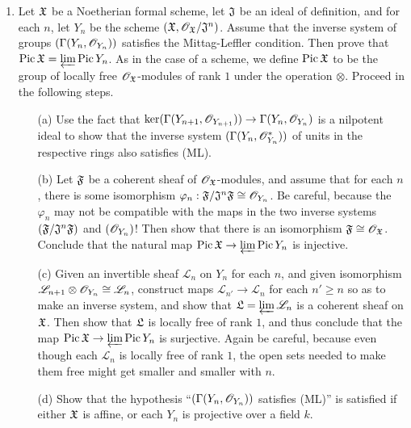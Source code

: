 \documentclass{article}
\begin{document}
\begin{enumerate} [label=\textbf{\arabic*.}, leftmargin=0em]
\item Let $\mathfrak{X}$ be a Noetherian formal scheme, let $\mathfrak{J}$ be an ideal of definition, and for each $n$, let $Y_n$ be the scheme $(\mathfrak{X}, \mathscr{O}_{\mathfrak{X}} / \mathfrak{J}^n)$. Assume that the inverse system of groups $(\Gamma(Y_n, \mathscr{O}_{Y_n}))$ satisfies the Mittag-Leffler condition. Then prove that $\operatorname{Pic}{\mathfrak{X}} = \varprojlim \operatorname{Pic}{Y_n}$. As in the case of a scheme, we define $\operatorname{Pic}{\mathfrak{X}}$ to be the group of locally free $\mathscr{O}_{\mathfrak{X}}$-modules of rank $1$ under the operation $\otimes$. Proceed in the following steps.
\begin{itemize}
    \item[(a)] Use the fact that $\text{ker}(\Gamma(Y_{n + 1}, \mathscr{O}_{Y_{n + 1}})) \to \Gamma(Y_n, \mathscr{O}_{Y_n})$ is a nilpotent ideal to show that the inverse system $(\Gamma(Y_n, \mathscr{O}_{Y_n}^*))$ of units in the respective rings also satisfies (ML).
    \item[(b)] Let $\mathfrak{F}$ be a coherent sheaf of $\mathscr{O}_{\mathfrak{X}}$-modules, and assume that for each $n$, there is some isomorphism $\varphi_n : \mathfrak{F} / \mathfrak{J}^n \mathfrak{F} \cong \mathscr{O}_{Y_n}$. Be careful, because the $\varphi_n$ may not be compatible with the maps in the two inverse systems $(\mathfrak{F} / \mathfrak{J}^n \mathfrak{F})$ and $(\mathscr{O}_{Y_n})$! Then show that there is an isomorphism $\mathfrak{F} \cong \mathscr{O}_{\mathfrak{X}}$. Conclude that the natural map $\operatorname{Pic}{\mathfrak{X}} \to \varprojlim{\operatorname{Pic}{Y_n}}$ is injective.
    \item[(c)] Given an invertible sheaf $\mathscr{L}_n$ on $Y_n$ for each $n$, and given isomorphism $\mathscr{L}_{n + 1} \otimes \mathscr{O}_{Y_n} \cong \mathscr{L}_n$, construct maps $\mathscr{L}_{n'} \to \mathscr{L}_n$ for each $n' \geq n$ so as to make an inverse system, and show that $\mathfrak{L} = \varprojlim \mathscr{L}_n$ is a coherent sheaf on $\mathfrak{X}$. Then show that $\mathfrak{L}$ is locally free of rank $1$, and thus conclude that the map $\operatorname{Pic}{\mathfrak{X}} \to \varprojlim \operatorname{Pic}{Y_n}$ is surjective. Again be careful, because even though each $\mathscr{L}_n$ is locally free of rank $1$, the open sets needed to make them free might get smaller and smaller with $n$.
    \item[(d)] Show that the hypothesis ``$(\Gamma(Y_n, \mathscr{O}_{Y_n}))$ satisfies (ML)'' is satisfied if either $\mathfrak{X}$ is affine, or each $Y_n$ is projective over a field $k$.
\end{itemize}

\end{enumerate}
\end{document}
